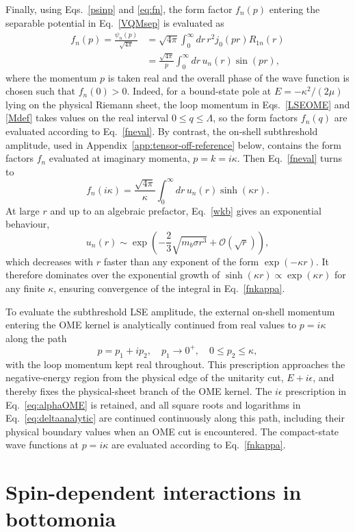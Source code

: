 \documentclass[aps,prd,showpacs,amsmath,twocolumn,superscriptaddress,floatfix,nofootinbib,notitlepage]{revtex4-2}
\newcommand{\be}{\begin{equation}}
\newcommand{\ee}{\end{equation}}
\begin{document}
Finally, using Eqs.~\eqref{psinp} and \eqref{eq:fn}, the form factor $f_n(p)$ entering the separable potential in Eq.~\eqref{VQMsep} is evaluated as
\be
\begin{split}
f_n(p)=\frac{\psi_n(p)}{\sqrt{4\pi}}
&=\sqrt{4\pi}\int_0^\infty dr\,r^2j_0(pr)R_{1n}(r)\\
&=\frac{\sqrt{4\pi}}{p}\int_0^\infty dr\,u_n(r)\sin(pr),
\label{fneval}
\end{split}
\ee
where the momentum $p$ is taken real and 
the overall phase of the wave function is chosen such that $f_n(0)>0$.
Indeed, for a bound-state pole at $E=-\kappa^2/(2\mu)$ lying on the physical Riemann sheet, the loop momentum in Eqs.~\eqref{LSEOME} and \eqref{Mdef} takes values on the real interval $0\leqslant q\leqslant\Lambda$, so the form factors $f_n(q)$ are evaluated according to Eq.~\eqref{fneval}. 
By contrast, the on-shell subthreshold amplitude, used in Appendix~\ref{app:tensor-off-reference} below, contains the form factors $f_n$ evaluated at imaginary momenta, $p=k=i\kappa$. Then Eq.~\eqref{fneval} turns to 
\be
f_n(i\kappa)=\frac{\sqrt{4\pi}}{\kappa}
\int_0^\infty dr\,u_n(r)\sinh(\kappa r).
\label{fnkappa}
\ee
At large $r$ and up to an algebraic prefactor, Eq.~\eqref{wkb} gives an exponential behaviour,
\be
u_n(r)\sim\exp\left(-\frac23\sqrt{m_b\sigma r^3}
+\mathcal{O}(\sqrt{r})\right),
\ee
which decreases with $r$ faster than any exponent of the form $\exp(-\kappa r)$. It therefore dominates over the exponential growth of
$\sinh(\kappa r)\propto\exp(\kappa r)$ for any finite $\kappa$, ensuring convergence of the integral in Eq.~\eqref{fnkappa}.

To evaluate the subthreshold LSE amplitude, the external on-shell momentum entering the OME kernel is analytically continued from real values to $p=i\kappa$ along the path
\be
p=p_1+ip_2,\quad p_1\to 0^+,\quad 0\leqslant p_2\leqslant\kappa,
\ee
with the loop momentum kept real throughout. This prescription approaches the negative-energy region from the physical edge of the unitarity cut, $E+i\epsilon$, and thereby fixes the physical-sheet branch of the OME kernel. The $i\epsilon$ prescription in Eq.~\eqref{eq:alphaOME} is retained, and all square roots and logarithms in Eq.~\eqref{eq:deltaanalytic} are continued continuously along this path, including their physical boundary values when an OME cut is encountered. The compact-state wave functions at $p=i\kappa$ are evaluated according to Eq.~\eqref{fnkappa}.

\section{Spin-dependent interactions in bottomonia}
\label{app:VSD}
\end{document}
